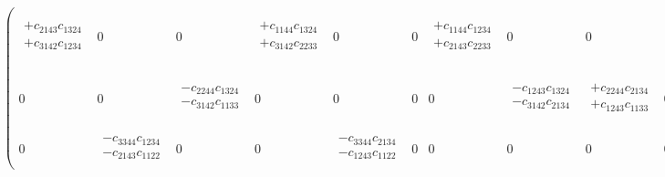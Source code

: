 \begin{eqnarray}
\begin{pmatrix}
\begin{array}{l}
+c_{2143}c_{1324} \\
+c_{3142}c_{1234} \\
\end{array} &
0 &
0 &
\begin{array}{l}
+c_{1144}c_{1324} \\
+c_{3142}c_{2233} \\
\end{array} &
0 &
0 &
\begin{array}{l}
+c_{1144}c_{1234} \\
+c_{2143}c_{2233} \\
\end{array} &
0 &
0 &
\begin{array}{l}
+c_{1144}c_{1144} \\
+c_{2143}c_{2143} \\
+c_{3142}c_{3142} \\
\end{array} &
0 &
0 &
0 \\
0 &
0 &
\begin{array}{l}
-c_{2244}c_{1324} \\
-c_{3142}c_{1133} \\
\end{array} &
0 &
0 &
0 &
0 &
\begin{array}{l}
-c_{1243}c_{1324} \\
-c_{3142}c_{2134} \\
\end{array} &
\begin{array}{l}
+c_{2244}c_{2134} \\
+c_{1243}c_{1133} \\
\end{array} &
0 &
0 &
0 &
0 &
\begin{array}{l}
+c_{2244}c_{2244} \\
+c_{1243}c_{1243} \\
+c_{3142}c_{3142} \\
\end{array} &
0 &
0 \\
0 &
\begin{array}{l}
-c_{3344}c_{1234} \\
-c_{2143}c_{1122} \\
\end{array} &
0 &
0 &
\begin{array}{l}
-c_{3344}c_{2134} \\
-c_{1243}c_{1122} \\
\end{array} &
0 &
0 &
0 &
0 &
0 &
0 &
\begin{array}{l}

\end{array}
\end{pmatrix}
\end{eqnarray}
